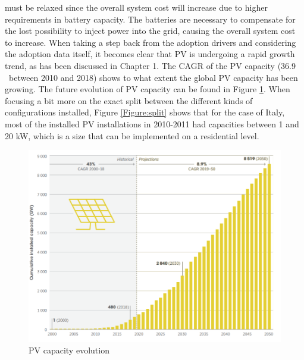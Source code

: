 must be relaxed since the overall system cost will increase due to higher requirements in battery capacity. The batteries are necessary to compensate for the lost possibility to inject power into the grid, causing the overall system cost to increase.
\newline \newline \noindent
When taking a step back from the adoption drivers and considering the adoption data itself, it becomes clear that PV is undergoing a rapid growth trend, as has been discussed in Chapter 1. The CAGR of the PV capacity (36.9 \  between 2010 and 2018) shows to what extent the global PV capacity has been growing. The future evolution of PV capacity can be found in Figure \ref{Figure:PVfut}. When focusing a bit more on the exact split between the different kinds of configurations installed, Figure \ref{Figure:split} shows that for the case of Italy, most of the installed PV installations in 2010-2011 had capacities between 1 and 20 kW, which is a size that can be implemented on a residential level.
\newline 
\begin{figure}[h!]
\centering
\includegraphics[width=6m]{PVfuture.png}
\caption[PV capacity evolution]{PV capacity evolution \cite{PVevolution}}
\label{Figure:PVfut}
\end{figure} 

